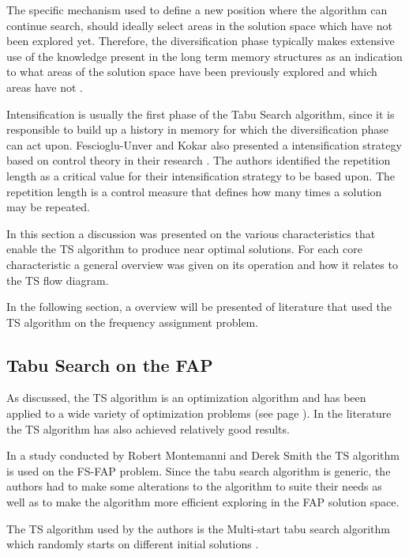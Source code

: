 The specific mechanism used to define a new position where the algorithm can continue search, should ideally select areas in the solution space which have not been explored yet. Therefore, the diversification phase typically makes extensive use of the knowledge present in the long term memory structures as an indication to what areas of the solution space have been previously explored and which areas have not \cite{TabuParameterization,TabuCrewSchedulingProblem,NonlinearGlobalTabu,SelfControllingReactiveTabu}.

Intensification is usually the first phase of the Tabu Search algorithm, since it is responsible to build up a history in memory for which the diversification phase can act upon. Fescioglu-Unver and Kokar also presented a intensification strategy based on control theory in their research \cite{SelfControllingReactiveTabu}. The authors identified the repetition length as a critical value for their intensification strategy to be based upon. The repetition length is a control measure that defines how many times a solution may be repeated.

In this section a discussion was presented on the various characteristics that enable the TS algorithm to produce near optimal solutions. For each core characteristic a general overview was given on its operation and how it relates to the TS flow diagram.

In the following section, a overview will be presented of literature that used the TS algorithm on the frequency assignment problem.
\subsection{Tabu Search on the FAP}
As discussed, the TS algorithm is an optimization algorithm and has been applied to a wide variety of optimization problems (see page \pageref{sec:TSOverview}). In the literature the TS algorithm has also achieved relatively good results.

In a study conducted by Robert Montemanni and Derek Smith \cite{TabuMontemanniSmith} the TS algorithm is used on the FS-FAP problem. Since the tabu search algorithm is generic, the authors had to make some alterations to the algorithm to suite their needs as well as to make the algorithm more efficient exploring in the FAP solution space.

The TS algorithm used by the authors is the Multi-start tabu search algorithm which randomly starts on different initial solutions \cite{TabuMontemanniSmith}.

